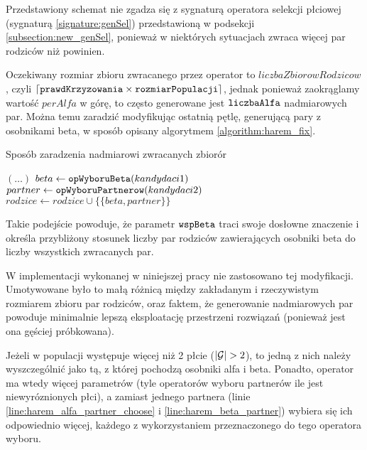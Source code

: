 \documentclass[./FM_mgr.tex]{subfiles}
\begin{document}
Przedstawiony schemat nie zgadza się z sygnaturą operatora selekcji płciowej (sygnaturą \ref{signature:genSel}) przedstawioną w podsekcji \ref{subsection:new_genSel}, ponieważ w niektórych sytuacjach zwraca więcej par rodziców niż powinien. 

Oczekiwany rozmiar zbioru zwracanego przez operator to $liczbaZbiorowRodzicow$, czyli $\lceil \mathtt{prawdKrzyzowania} \times \mathtt{rozmiarPopulacji} \rceil$, jednak ponieważ zaokrąglamy wartość $perAlfa$ w górę, to często generowane jest $\mathtt{liczbaAlfa}$ nadmiarowych par.
Można temu zaradzić modyfikując ostatnią pętlę, generującą pary z osobnikami beta, w sposób opisany algorytmem \ref{algorithm:harem_fix}.

\begin{algorithm}
	\caption{Sposób zaradzenia nadmiarowi zwracanych zbiorór \label{algorithm:harem_fix}}
	\begin{algorithmic}[1]
		\Start
		\State $(\dots)$
		\setcounter{ALG@line}{14}
		\Var $beta \gets \mathtt{opWyboruBeta}(kandydaci1)$
		\Var $partner \gets \mathtt{opWyboruPartnerow}(kandydaci2)$
		\State $rodzice \gets rodzice \cup \{ \{ beta, partner \} \}$
		\EndWhile
		\State {}
		\EndOperator
	\end{algorithmic}
\end{algorithm}

Takie podejście powoduje, że parametr $\mathtt{wspBeta}$ traci swoje dosłowne znaczenie i określa przybliżony stosunek liczby par rodziców zawierających osobniki beta do liczby wszystkich zwracanych par.

W implementacji wykonanej w niniejszej pracy nie zastosowano tej modyfikacji.
Umotywowane było to małą różnicą między zakładanym i rzeczywistym rozmiarem zbioru par rodziców, oraz faktem, że  generowanie nadmiarowych par powoduje minimalnie lepszą eksploatację przestrzeni rozwiązań (ponieważ jest ona gęściej próbkowana).

Jeżeli w populacji występuje więcej niż 2 płcie ($|\mathcal{G}| > 2$), to jedną z nich należy wyszczególnić jako tą, z której pochodzą osobniki alfa i beta. 
Ponadto, operator ma wtedy więcej parametrów (tyle operatorów wyboru partnerów ile jest niewyróznionych płci), a zamiast jednego partnera (linie \ref{line:harem_alfa_partner_choose} i \ref{line:harem_beta_partner}) wybiera się ich odpowiednio więcej, każdego z wykorzystaniem przeznaczonego do tego operatora wyboru.
\end{document}
